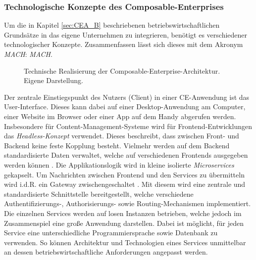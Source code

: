 \subsubsection{Technologische Konzepte des Composable-Enterprises}
Um die in Kapitel \ref{sec:CEA_B} beschriebenen betriebswirtschaftlichen Grundsätze in das eigene Unternehmen zu integrieren, benötigt es verschiedener technologischer Konzepte. Zusammenfassen lässt sich dieses mit dem Akronym \textit{MACH}: \textit{\acl{MACH}}.
\begin{center}
	\begin{figure}[H]
		\centering
		\caption[Technische Realisierung der Composable-Enterprise-Architektur]{Technische Realisierung der Composable-Enterprise-Architektur. Eigene Darstellung.}
		\label{fig:CEA_K}
	\end{figure}	
\end{center}
\vspace*{-15mm}
Der zentrale Einstiegspunkt des Nutzers (Client) in einer CE-Anwendung ist das User-Interface. Dieses kann dabei auf einer Desktop-Anwendung am Computer, einer Website im Browser oder einer App auf dem Handy abgerufen werden. Insbesondere für Content-Management-Systeme wird für Frontend-Entwicklungen das \textit{Headless-Konzept} verwendet. Dieses beschreibt, dass zwischen Front- und Backend keine feste Kopplung besteht. Vielmehr werden auf dem Backend standardisierte Daten verwaltet, welche auf verschiedenen Frontends ausgegeben werden können \cite{.20230313}. Die Applikationslogik wird in kleine isolierte \textit{Microservices} gekapselt. Um Nachrichten zwischen Frontend und den Services zu übermitteln wird i.d.R. ein Gateway zwischengeschaltet \cite[41]{.2009}. Mit diesem wird eine zentrale und standardisierte Schnittstelle bereitgestellt, welche verschiedene Authentifizierungs-, Authorisierungs- sowie Routing-Mechanismen implementiert. Die einzelnen Services werden auf losen Instanzen betrieben, welche jedoch im Zusammenspiel eine große Anwendung darstellen. Dabei ist möglicht, für jeden Service eine unterschiedliche Programmiersprache sowie Datenbank zu verwenden. So können Architektur und Technologien eines Services unmittelbar an dessen betriebswirtschaftliche Anforderungen angepasst werden.
